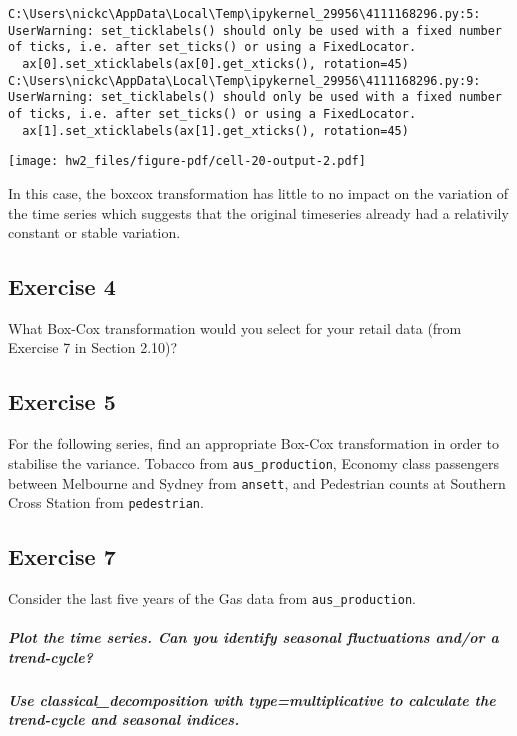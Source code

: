 \documentclass[
  11pt,
]{article}
\let\oldsubparagraph\subparagraph
\renewcommand{\subparagraph}[1]{\oldsubparagraph{#1}\mbox{}}
\begin{document}
\begin{verbatim}
C:\Users\nickc\AppData\Local\Temp\ipykernel_29956\4111168296.py:5: UserWarning: set_ticklabels() should only be used with a fixed number of ticks, i.e. after set_ticks() or using a FixedLocator.
  ax[0].set_xticklabels(ax[0].get_xticks(), rotation=45)
C:\Users\nickc\AppData\Local\Temp\ipykernel_29956\4111168296.py:9: UserWarning: set_ticklabels() should only be used with a fixed number of ticks, i.e. after set_ticks() or using a FixedLocator.
  ax[1].set_xticklabels(ax[1].get_xticks(), rotation=45)
\end{verbatim}

\texttt{[image: hw2\_files/figure-pdf/cell-20-output-2.pdf]}

In this case, the boxcox transformation has little to no impact on the
variation of the time series which suggests that the original timeseries
already had a relativily constant or stable variation.

\subsection{Exercise 4}\label{exercise-4}

What Box-Cox transformation would you select for your retail data (from
Exercise 7 in Section 2.10)?

\subsection{Exercise 5}\label{exercise-5}

For the following series, find an appropriate Box-Cox transformation in
order to stabilise the variance. Tobacco from \texttt{aus\_production},
Economy class passengers between Melbourne and Sydney from
\texttt{ansett}, and Pedestrian counts at Southern Cross Station from
\texttt{pedestrian}.

\subsection{Exercise 7}\label{exercise-7}

Consider the last five years of the Gas data from
\texttt{aus\_production}.

\subparagraph{Plot the time series. Can you identify seasonal
fluctuations and/or a
trend-cycle?}\label{plot-the-time-series.-can-you-identify-seasonal-fluctuations-andor-a-trend-cycle}

\subparagraph{Use classical\_decomposition with type=multiplicative to
calculate the trend-cycle and seasonal
indices.}\label{use-classical_decomposition-with-typemultiplicative-to-calculate-the-trend-cycle-and-seasonal-indices.}
\end{document}
